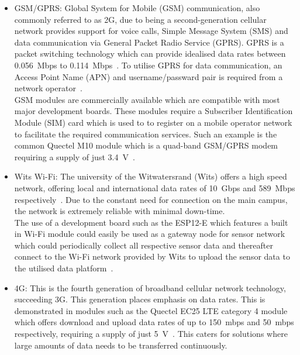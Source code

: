 \documentclass[10pt,twocolumn]{witseiepaper}
\begin{document}
			\begin{itemize}
				\item GSM/GPRS:
				Global System for Mobile (GSM) communication, also commonly referred to as 2G, due to being a second-generation cellular network provides support for voice calls, Simple Message System (SMS) and data communication via General Packet Radio Service (GPRS). GPRS is a packet switching technology which can provide idealised data rates between 0.056~Mbps to 0.114~Mbps~\cite{gprs}. To utilise GPRS for data communication, an Access Point Name (APN) and username/passward pair is required from a network operator~\cite{gprs}.\\
				
				GSM modules are commercially available which are compatible with most major development boards. These modules require a Subscriber Identification Module (SIM) card which is used to to register on a mobile operator network to facilitate the required communication services. Such an example is the common Quectel M10 module which is a quad-band GSM/GPRS modem requiring a supply of just 3.4~V~\cite{m10}.\\

				\item Wits Wi-Fi:
				The university of the Witwatersrand (Wits) offers a high speed network, offering local and international data rates of 10~Gbps and 589~Mbps respectively~\cite{wits-speed}. Due to the constant need for connection on the main campus, the network is extremely reliable with minimal down-time.\\
				
				The use of a development board such as the ESP12-E which features a built in Wi-Fi module could easily be used as a gateway node for sensor network which could periodically collect all respective sensor data and thereafter connect to the Wi-Fi network provided by Wits to upload the sensor data to the utilised data platform~\cite{esp12e}.\\
			
				\item 4G:
				This is the fourth generation of broadband cellular network technology, succeeding 3G. This generation places emphasis on data rates. This is demonstrated in modules such as the Quectel EC25 LTE category 4 module which offers download and upload data rates of up to 150~mbps and 50~mbps respectively, requiring a supply of just 5~V~\cite{ec25}. This caters for solutions where large amounts of data needs to be transferred continuously.

			
			\end{itemize}
\end{document}
